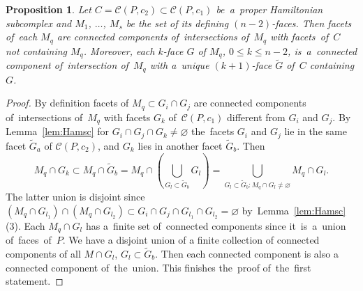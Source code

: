 \documentclass[12pt]{amsart}
\newtheorem{proposition}[formula]{Proposition}
\theoremstyle{definition}
\theoremstyle{remark}
\begin{document}
\begin{proposition}\label{prop:kdefk+1}
Let $C=\mathcal{C}(P,c_2)\subset\mathcal{C}(P,c_1)$ be~a~proper %
Hamiltonian subcomplex and $M_1$, $\dots$, $M_s$
be the set of its defining $(n-2)$-faces. Then facets of~each $M_q$ are connected components of~intersections 
of~$M_q$ with facets~of~$C$ not containing $M_q$. Moreover, each $k$-face $G$ of $M_q$, $0\leqslant k\leqslant n-2$, 
is~a~connected component of~intersection of~$M_q$ with a~unique $(k+1)$-face $\widetilde{G}$ of~$C$ containing $G$.
\end{proposition}
\begin{proof}
By definition facets of $M_q\subset G_i\cap G_j$ are connected components of~intersections of~$M_q$
with facets $G_k$ of~$\mathcal{C}(P,c_1)$ different from $G_i$ and $G_j$. 
By Lemma~\ref{lem:Hamsc} for $G_i\cap G_j\cap G_k\ne\varnothing$
the~facets $G_i$ and $G_j$ lie in the same facet $\widetilde{G}_a$ of $\mathcal{C}(P,c_2)$, and 
$G_k$ lies in another facet $\widetilde{G}_b$. Then 
$$
M_q\cap G_k\subset M_q\cap \widetilde{G}_b=M_q\cap\left(\bigcup\limits_{G_l\subset \widetilde{G}_b}G_l\right)=
\bigcup\limits_{G_l\subset \widetilde{G}_b\colon M_q\cap G_l\ne\varnothing}M_q\cap G_l.
$$
The latter union is disjoint since $(M_q\cap G_{l_1})\cap (M_q\cap G_{l_2})\subset G_i\cap G_j\cap G_{l_1}\cap G_{l_2}=\varnothing$
by~Lemma~\ref{lem:Hamsc}(3). Each $M_q\cap G_l$ has a~finite set of~connected components since 
it~is~a~union of~faces~of~$P$. We have a disjoint union of a finite collection of connected components of all $M\cap G_l$, 
$G_l\subset \widetilde{G}_b$. Then each connected component is also a connected component of~the~union. 
This finishes the~proof of~the~first statement. 


\end{proof}
\end{document}
